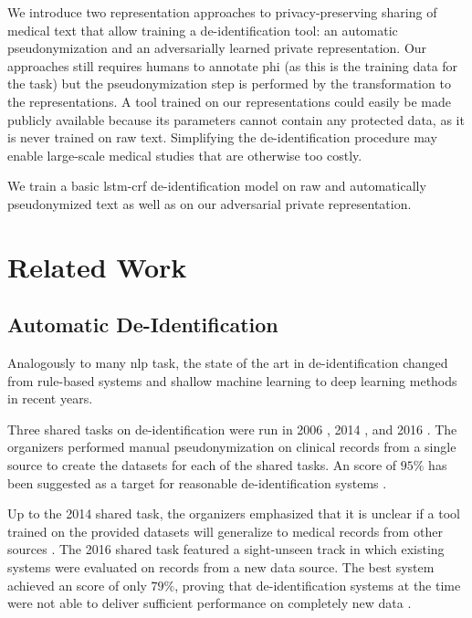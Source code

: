 %
We introduce two representation approaches to privacy-preserving sharing of medical text that allow training a de-identification tool: an automatic pseudonymization and an adversarially learned private representation.
%
Our approaches still requires humans to annotate \ac{phi} (as this is the training data for the task) but the pseudonymization step is performed by the transformation to the representations.
%
A tool trained on our representations could easily be made publicly available because its parameters cannot contain any protected data, as it is never trained on raw text.
%
Simplifying the de-identification procedure may enable large-scale medical studies that are otherwise too costly.

We train a basic \acs{lstm}-\acs{crf} de-identification model on raw and automatically pseudonymized text as well as on our adversarial private representation.
%

\section{Related Work}\label{sec:related}
%


\subsection{Automatic De-Identification}
%
Analogously to many \ac{nlp} task, the state of the art in de-identification changed from rule-based systems and shallow machine learning \citep{uzuner2007evaluating,meystre2010automatic} to deep learning methods \citep{stubbs2017identification, dernoncourt2017identification, liu2017identification} in recent years.

%
Three shared tasks on de-identification were run in 2006 \citep{uzuner2007evaluating}, 2014 \citep{stubbs2015annotating, stubbs2015automated}, and 2016 \citep{stubbs2017identification}.
%
The organizers performed manual pseudonymization on clinical records from a single source to create the datasets for each of the shared tasks.
%
An \fone score of $95\%$ has been suggested as a target for reasonable de-identification systems \citep{stubbs2015automated}.

%
Up to the 2014 shared task, the organizers emphasized that it is unclear if a tool trained on the provided datasets will generalize to medical records from other sources \citep{uzuner2007evaluating,stubbs2015automated}.
%
The 2016 shared task featured a sight-unseen track in which existing systems were evaluated on records from a new data source.
%
The best system achieved an \fone score of only $79\%$, proving that de-identification systems at the time were not able to deliver sufficient performance on completely new data \citep{stubbs2017identification}.

